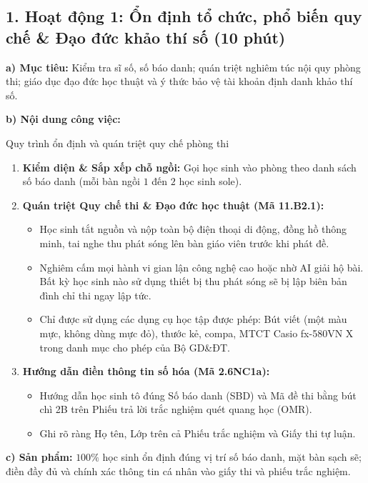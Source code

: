 \documentclass[12pt, a4paper]{article}
\begin{document}
\subsection*{1. Hoạt động 1: Ổn định tổ chức, phổ biến quy chế \& Đạo đức khảo thí số (10 phút)}

\noindent \textbf{a) Mục tiêu:}
Kiểm tra sĩ số, số báo danh; quán triệt nghiêm túc nội quy phòng thi; giáo dục đạo đức học thuật và ý thức bảo vệ tài khoản định danh khảo thí số.

\noindent \textbf{b) Nội dung công việc:}
\begin{pedabox}{Quy trình ổn định và quán triệt quy chế phòng thi}
\begin{enumerate}[leftmargin=0.6cm]
    \item \textbf{Kiểm diện \& Sắp xếp chỗ ngồi:} Gọi học sinh vào phòng theo danh sách số báo danh (mỗi bàn ngồi $1$ đến $2$ học sinh sole).
    \item \textbf{Quán triệt Quy chế thi \& Đạo đức học thuật (Mã 11.B2.1):}
    \begin{itemize}
        \item Học sinh tắt nguồn và nộp toàn bộ điện thoại di động, đồng hồ thông minh, tai nghe thu phát sóng lên bàn giáo viên trước khi phát đề.
        \item Nghiêm cấm mọi hành vi gian lận công nghệ cao hoặc nhờ AI giải hộ bài. Bất kỳ học sinh nào sử dụng thiết bị thu phát sóng sẽ bị lập biên bản đình chỉ thi ngay lập tức.
        \item Chỉ được sử dụng các dụng cụ học tập được phép: Bút viết (một màu mực, không dùng mực đỏ), thước kẻ, compa, MTCT Casio fx-580VN X trong danh mục cho phép của Bộ GD\&ĐT.
    \end{itemize}
    \item \textbf{Hướng dẫn điền thông tin số hóa (Mã 2.6NC1a):}
    \begin{itemize}
        \item Hướng dẫn học sinh tô đúng Số báo danh (SBD) và Mã đề thi bằng bút chì 2B trên Phiếu trả lời trắc nghiệm quét quang học (OMR).
        \item Ghi rõ ràng Họ tên, Lớp trên cả Phiếu trắc nghiệm và Giấy thi tự luận.
    \end{itemize}
\end{enumerate}
\end{pedabox}

\noindent \textbf{c) Sản phẩm:}
$100\%$ học sinh ổn định đúng vị trí số báo danh, mặt bàn sạch sẽ; điền đầy đủ và chính xác thông tin cá nhân vào giấy thi và phiếu trắc nghiệm.
\end{document}
